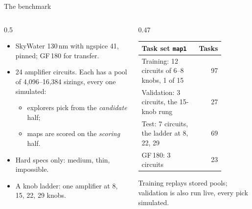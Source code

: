 \begin{frame}{The benchmark}
  \begin{columns}[T]
    \begin{column}{0.5\textwidth}
      \small
      \begin{itemize}
        \item SkyWater 130\,nm with ngspice 41, pinned; GF\,180 for transfer.
        \item 24 amplifier circuits. Each has a pool of 4,096--16,384 sizings, \alert{every one simulated}:
          \begin{itemize}
            \item explorers pick from the \emph{candidate} half;
            \item maps are scored on the \emph{scoring} half.
          \end{itemize}
        \item Hard specs only: medium, thin, impossible.
        \item A \alert{knob ladder}: one amplifier at 8, 15, 22, 29 knobs.
      \end{itemize}
    \end{column}
    \begin{column}{0.47\textwidth}
      \centering\small
      \begin{tabular}{@{}>{\raggedright\arraybackslash}p{0.74\linewidth}r@{}}
        \toprule
        Task set \texttt{map1} & Tasks \\
        \midrule
        Training: 12 circuits of 6--8 knobs, 1 of 15 & 97 \\
        Validation: 3 circuits, the 15-knob rung & 27 \\
        Test: 7 circuits, the ladder at 8, 22, 29 & 69 \\
        \midrule
        GF\,180: 3 circuits & 23 \\
        \bottomrule
      \end{tabular}

      \vspace{2mm}
      \footnotesize Training replays stored pools; validation is also run live, every pick simulated.
    \end{column}
  \end{columns}
\end{frame}

